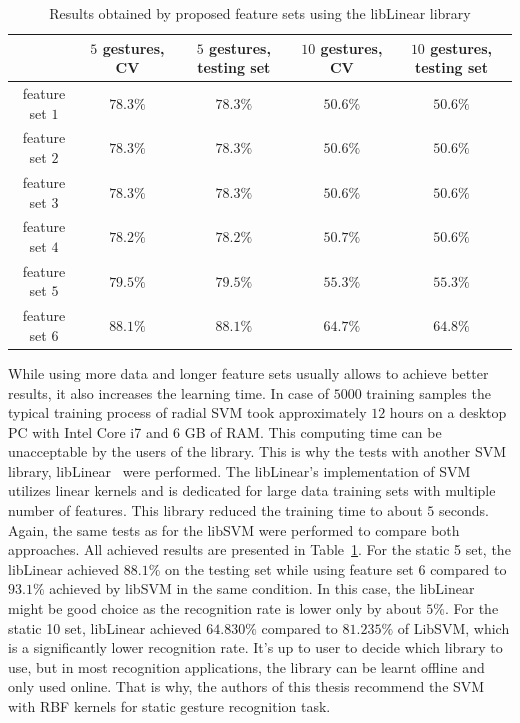 \begin{table}[htp!]
\begin{center}
	\label{staticfeatlin}
	\caption{Results obtained by proposed feature sets using the libLinear library}
    \begin{tabular}{ccccc}
    \hline
    ~                                                   & $5$ gestures, CV & $5$ gestures, testing set & $10$ gestures, CV  & $10$ gestures, testing set \\ \hline \hline
    feature set $1$                     & $78.3\%$ & $78.3\%$  & $50.6\%$ & $50.6\%$ \\ \hline
    feature set $2$                     & $78.3\%$ & $78.3\%$  & $50.6\%$ & $50.6\%$ \\ \hline
    feature set $3$                     & $78.3\%$ & $78.3\%$  & $50.6\%$ & $50.6\%$ \\ \hline
    feature set $4$                     & $78.2\%$ & $78.2\%$  & $50.7\%$ & $50.6\%$ \\ \hline
    feature set $5$                     & $79.5\%$ & $79.5\%$  & $55.3\%$ & $55.3\%$ \\ \hline
    feature set $6$                     & $88.1\%$ & $88.1\%$  & $64.7\%$ & $64.8\%$ \\ \hline
    \end{tabular}
    \end{center}
\end{table}

While using more data and longer feature sets usually allows to achieve better results, it also increases the learning time. 
In case of $5000$ training samples the typical training process of radial SVM took approximately $12$ hours on a desktop PC with Intel Core i7 and 6 GB of RAM. 
This computing time can be unacceptable by the users of the library. 
This is why the tests with another SVM library, libLinear~\cite{libLinear} were performed. 
The libLinear's implementation of SVM utilizes linear kernels and is dedicated for large data training sets with multiple number of features. 
This library reduced the training time to about $5$ seconds.
Again, the same tests as for the libSVM were performed to compare both approaches.
All achieved results are presented in Table~\ref{staticfeatlin}.
For the static 5 set, the libLinear achieved $88.1\%$ on the testing set while using feature set 6 compared to $93.1\%$ achieved by libSVM in the same condition.
In this case, the libLinear might be good choice as the recognition rate is lower only by about $5\%$.
For the static 10 set, libLinear achieved $64.830\%$ compared to $81.235\%$ of LibSVM, which is a significantly lower recognition rate.
It's up to user to decide which library to use, but in most recognition applications, the library can be learnt offline and only used online.
That is why, the authors of this thesis recommend the SVM with RBF kernels for static gesture recognition task.

